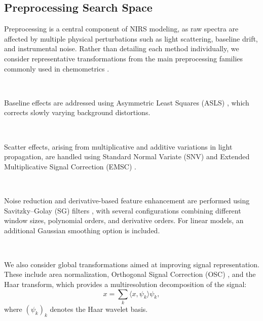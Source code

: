 \documentclass{article}
\begin{document}
\subsection{Preprocessing Search Space} \label{preprocs}

Preprocessing is a central component of NIRS modeling, as raw spectra are affected by multiple physical perturbations such as light scattering, baseline drift, and instrumental noise. Rather than detailing each method individually, we consider representative transformations from the main preprocessing families commonly used in chemometrics \cite{Rinnan2009Preprocessing}.

~

Baseline effects are addressed using Asymmetric Least Squares (ASLS) \cite{eilers_baseline_2005}, which corrects slowly varying background distortions.

~

Scatter effects, arising from multiplicative and additive variations in light propagation, are handled using Standard Normal Variate (SNV) \cite{barnes_standard_1989} and Extended Multiplicative Signal Correction (EMSC) \cite{Martens1991EMSC}.

~

Noise reduction and derivative-based feature enhancement are performed using Savitzky--Golay (SG) filters \cite{Savitzky1964SG}, with several configurations combining different window sizes, polynomial orders, and derivative orders. For linear models, an additional Gaussian smoothing option is included.

~

We also consider global transformations aimed at improving signal representation. These include area normalization, Orthogonal Signal Correction (OSC) \cite{wold_orthogonal_1998}, and the Haar transform, which provides a multiresolution decomposition of the signal:
\begin{equation}
x = \sum_{k} \langle x, \psi_k \rangle \psi_k,
\end{equation}
where $(\psi_k)_k$ denotes the Haar wavelet basis.

~
\end{document}
